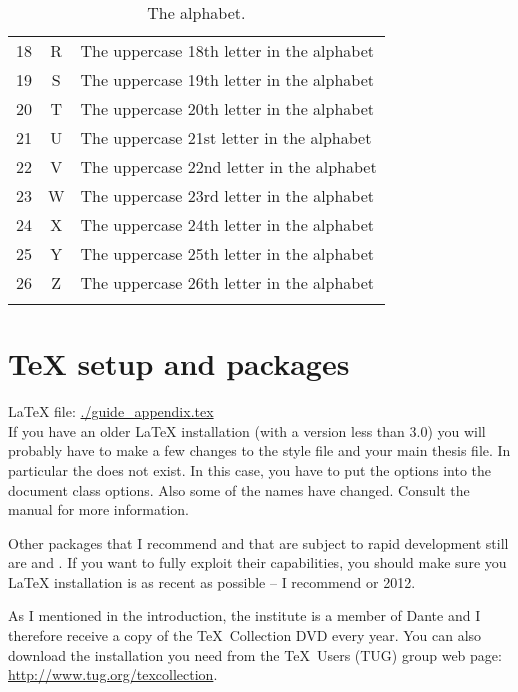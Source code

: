 \begin{longtable}{rcl}
  18 & R & The uppercase 18th letter in the alphabet\\
  19 & S & The uppercase 19th letter in the alphabet\\
  20 & T & The uppercase 20th letter in the alphabet\\
  21 & U & The uppercase 21st letter in the alphabet\\
  22 & V & The uppercase 22nd letter in the alphabet\\
  23 & W & The uppercase 23rd letter in the alphabet\\
  24 & X & The uppercase 24th letter in the alphabet\\
  25 & Y & The uppercase 25th letter in the alphabet\\
  26 & Z & The uppercase 26th letter in the alphabet\\
  \bottomrule
\caption{The alphabet.}
\label{tab:alphabet}
\end{longtable}


\chapter{\TeX{} setup and packages}
\label{sec:app:tex}

\LaTeX{} file: \url{./guide_appendix.tex}\\[1ex]
\noindent
If you have an older \LaTeX{} installation (with a \KOMAScript{}
version less than 3.0) you will probably have to make a few changes to
the style file and your main thesis file.
In particular the  does not exist. In this case, you
have to put the options into the document class options. Also some of
the names have changed. Consult the \KOMAScript{} manual for more
information.

Other packages that I recommend and that are subject to rapid
development still are  and
. If you want to fully exploit their capabilities,
you should make sure you \LaTeX{} installation is as recent as
possible -- I recommend  or 2012.

As I mentioned in the introduction, the institute is a member of Dante
and I therefore receive a copy of the \TeX\ Collection DVD every
year. You can also download the installation you need from the \TeX\
Users (TUG) group web page: \url{http://www.tug.org/texcollection}.

